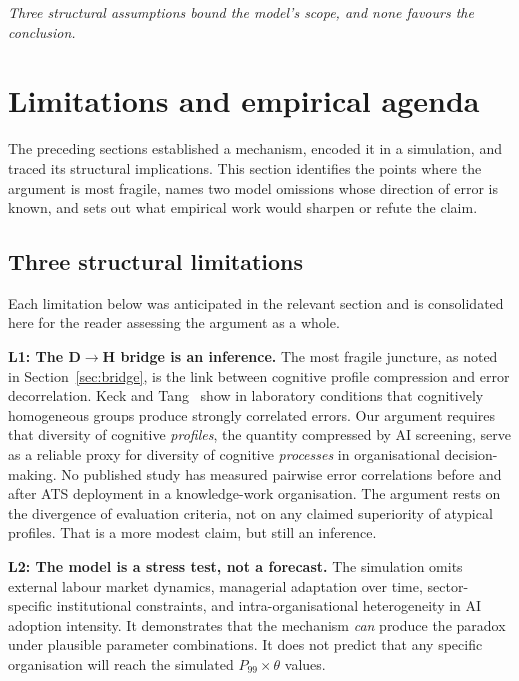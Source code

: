 \documentclass[11pt,a4paper]{article}
\newcommand{\bridgeskip}{\vspace{6pt}}
\begin{document}
\bridgeskip
\noindent\textit{Three structural assumptions bound the model's scope, and
none favours the conclusion.}

\section{Limitations and empirical agenda}\label{sec:limitations}

The preceding sections established a mechanism, encoded it in a simulation,
and traced its structural implications. This section identifies the points
where the argument is most fragile, names two model omissions whose
direction of error is known, and sets out what empirical work would sharpen
or refute the claim.

\subsection{Three structural limitations}

Each limitation below was anticipated in the relevant section and is
consolidated here for the reader assessing the argument as a whole.

\textbf{L1: The D$\rightarrow$H bridge is an inference.} The most fragile
juncture, as noted in Section~\ref{sec:bridge}, is the link between
cognitive profile compression and error decorrelation. Keck and
Tang~\cite{keck_psychsci_2020} show in laboratory conditions that
cognitively homogeneous groups produce strongly correlated errors. Our
argument requires that diversity of cognitive \textit{profiles}, the
quantity compressed by AI screening, serve as a reliable proxy for
diversity of cognitive \textit{processes} in organisational
decision-making. No published study has measured pairwise error correlations
before and after ATS deployment in a knowledge-work organisation. The
argument rests on the divergence of evaluation criteria, not on any claimed
superiority of atypical profiles. That is a more modest claim, but still an
inference.

\textbf{L2: The model is a stress test, not a forecast.} The simulation
omits external labour market dynamics, managerial adaptation over time,
sector-specific institutional constraints, and intra-organisational
heterogeneity in AI adoption intensity. It demonstrates that the mechanism
\textit{can} produce the paradox under plausible parameter combinations. It
does not predict that any specific organisation will reach the simulated
$P_{99}\times\theta$ values.
\end{document}
